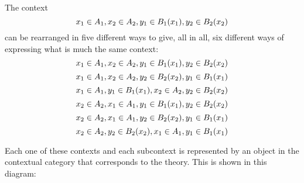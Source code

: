 \documentclass[10pt,a4paper]{scrartcl}
\begin{document}
The context 
\begin{equation}
x_1 \in A_1,x_2 \in A_2,y_1 \in B_1(x_1),y_2 \in B_2(x_2)
\end{equation}
can be rearranged in five different ways to give, all in all, six different ways of expressing
what is much the same context:
\begin{equation}
x_1 \in A_1, x_2 \in A_2, y_1 \in B_1(x_1), y_2 \in B_2(x_2)
\end{equation}
\begin{equation}
x_1 \in A_1, x_2 \in A_2, y_2 \in B_2(x_2), y_1 \in B_1(x_1)
\end{equation}
\begin{equation}
x_1 \in A_1, y_1 \in B_1(x_1), x_2 \in A_2, y_2 \in B_2(x_2)
\end{equation}
\begin{equation}
x_2 \in A_2, x_1 \in A_1, y_1 \in B_1(x_1), y_2 \in B_2(x_2)
\end{equation}
\begin{equation}
x_2 \in A_2, x_1 \in A_1, y_2 \in B_2(x_2), y_1 \in B_1(x_1)
\end{equation}
\begin{equation}
x_2 \in A_2, y_2 \in B_2(x_2), x_1 \in A_1, y_1 \in B_1(x_1)
\end{equation}


Each one of these contexts and each subcontext is represented by an object
in the contextual category   that corresponds to the theory. This is
shown in this diagram:
\end{document}
